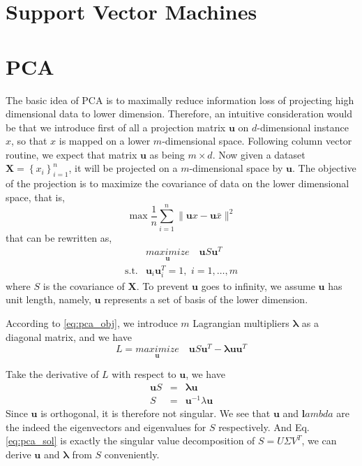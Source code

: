 \documentclass{article}
\newcommand{\vct}[1]{\ensuremath{\boldsymbol{#1}}} %
\begin{document}
\section{Support Vector Machines}


\section{PCA}
The basic idea of PCA is to maximally reduce information loss of projecting high dimensional data to lower dimension. Therefore, an intuitive consideration would be that we introduce first of all a projection matrix $\vct u$ on $d$-dimensional instance $x$, so that $x$ is mapped on a lower $m$-dimensional space. Following column vector routine, we expect that matrix $\vct u$ as being $m \times d$. Now given a dataset $ \vct X = \left\{  x_i\right\}_{i=1}^{n}$, it will be projected on a $ m $-dimensional space by $\vct u$. The objective of the projection is to maximize the covariance of data on the lower dimensional space, that is,
\[
	\max \dfrac{1}{n}\sum_{i=1}^{n}\|\vct ux - \vct u\bar{x}\|^2
\]
that can be rewritten as,
\begin{eqnarray}
	& \underset{\vct u}{\textit{maximize}}\quad \vct u S \vct u^T \nonumber \\
	\text{s.t.} & \vct u_i\vct u_i^T = 1, \,\, i=1,\ldots,m
	\label{eq:pca_obj}
\end{eqnarray}
where $S$ is the covariance of $\vct X$. To prevent $\vct u$ goes to infinity, we assume $\vct u$ has unit length, namely, $\vct u$ represents a set of basis of the lower dimension.

According to \eqref{eq:pca_obj}, we introduce $m$ Lagrangian multipliers $\vct \lambda$ as a diagonal matrix, and we have
\[ L = \underset{\vct u}{\textit{maximize}}\quad \vct u S \vct u^T - \vct\lambda \vct u\vct u^T \]

Take the derivative of $L$ with respect to $\vct u$, we have
\begin{eqnarray}
	\vct uS & = & \vct\lambda\vct u \nonumber \\
	S & = & \vct u^{-1}\lambda\vct u
	\label{eq:pca_sol}
\end{eqnarray}
Since $\vct u$ is orthogonal, it is therefore not singular. We see that $\vct u$ and $\vct lambda$ are the indeed the eigenvectors and eigenvalues for $S$ respectively. And Eq.\eqref{eq:pca_sol} is exactly the singular value decomposition of $S=U\Sigma V^T$, we can derive $\vct u$ and $ \vct{\lambda} $ from $S$ conveniently.



\end{document}
